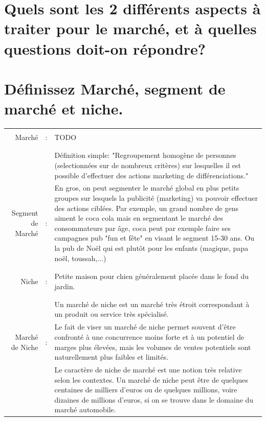 \documentclass{article}
\begin{document}
\section{Quels sont les 2 différents aspects à traiter pour le marché, et à quelles questions doit-on répondre?}

\section{Définissez Marché, segment de marché et niche.}
\begin{tabular}{|rcl|}
\hline
&&\\
Marché & : & TODO\\ %
&&\\
\hline
&&\\
&& \multicolumn{1}{p{.8\textwidth}|}{Définition simple: "Regroupement homogène de personnes (selectionnées sur de nombreux critères) sur lesquelles il est possible d'effectuer des actions marketing de différenciations."}\\
Segment de Marché & : & \multicolumn{1}{p{.8\textwidth}|}{En gros, on peut segmenter le marché global en plus petits groupes sur lesquels la publicité (marketing) va pouvoir effectuer des actions ciblées. Par exemple, un grand nombre de gens aiment le coca cola mais en segmentant le marché des consommateurs par âge, coca peut par exemple faire ses campagnes pub "fun et fête" en visant le segment 15-30 ans. Ou la pub de Noël qui est plutôt pour les enfants (magique, papa noël, toussah,...)}\\
&&\\
\hline
&&\\
Niche & : & \multicolumn{1}{p{.8\textwidth}|}{Petite maison pour chien généralement placée dans le fond du jardin.}\\
&&\\
\hline
&&\\
				 &   & \multicolumn{1}{p{.8\textwidth}|}{Un marché de niche est un marché très étroit correspondant à un produit ou service très spécialisé.}\\
Marché de Niche & : & \multicolumn{1}{p{.8\textwidth}|}{Le fait de viser un marché de niche permet souvent d’être confronté à une concurrence moins forte et à un potentiel de marges plus élevées, mais les volumes de ventes potentiels sont naturellement plus faibles et limités.}\\
				 &  & \multicolumn{1}{p{.8\textwidth}|}{Le caractère de niche de marché est une notion très relative selon les contextes. Un marché de niche peut être de quelques centaines de milliers d’euros ou de quelques millions, voire dizaines de millions d’euros, si on se trouve dans le domaine du marché automobile.}\\

\end{tabular}
\end{document}
